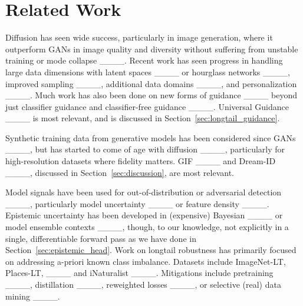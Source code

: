 \section{Related Work}
Diffusion has seen wide success, particularly in image generation, where it outperform GANs in image quality and diversity without suffering from unstable training or mode collapse ____. Recent work has seen progress in handling large data dimensions with latent spaces ____ or hourglass networks ____, improved sampling ____, additional data domains ____, and personalization ____. Much work has also been done on new forms of guidance ____ beyond just classifier guidance and classifier-free guidance ____. Universal Guidance ____ is most relevant, and is discussed in Section~\ref{sec:longtail_guidance}. 

Synthetic training data from generative models has been considered since GANs ____, but has started to come of age with diffusion ____, particularly for high-resolution datasets where fidelity matters. GIF ____ and Dream-ID ____, discussed in Section~\ref{sec:discussion}, are most relevant.

Model signals have been used for out-of-distribution or adversarial detection ____, particularly model uncertainty ____ or feature density ____. Epistemic uncertainty has been developed in (expensive) Bayesian ____ or model ensemble contexts ____, though, to our knowledge, not explicitly in a single, differentiable forward pass as we have done in Section~\ref{sec:epistemic_head}. Work on longtail robustness has primarily focused on addressing a-priori known class imbalance. Datasets include ImageNet-LT, Places-LT, ____ and iNaturalist ____. Mitigations include pretraining ____, distillation ____, reweighted losses ____, or selective (real) data mining ____.